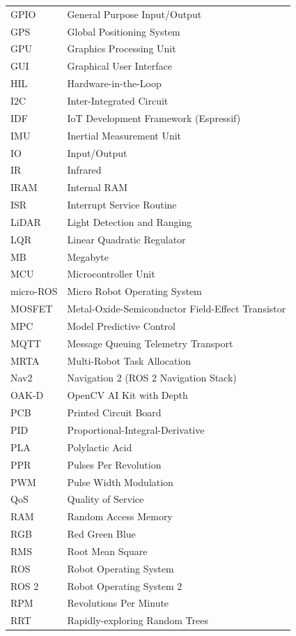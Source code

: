 \begin{longtable}{@{}p{3.5cm} p{10cm}@{}}
GPIO & General Purpose Input/Output \\
GPS & Global Positioning System \\
GPU & Graphics Processing Unit \\
GUI & Graphical User Interface \\
HIL & Hardware-in-the-Loop \\
I2C & Inter-Integrated Circuit \\
IDF & IoT Development Framework (Espressif) \\
IMU & Inertial Measurement Unit \\
IO & Input/Output \\
IR & Infrared \\
IRAM & Internal RAM \\
ISR & Interrupt Service Routine \\
LiDAR & Light Detection and Ranging \\
LQR & Linear Quadratic Regulator \\
MB & Megabyte \\
MCU & Microcontroller Unit \\
micro-ROS & Micro Robot Operating System \\
MOSFET & Metal-Oxide-Semiconductor Field-Effect Transistor \\
MPC & Model Predictive Control \\
MQTT & Message Queuing Telemetry Transport \\
MRTA & Multi-Robot Task Allocation \\
Nav2 & Navigation 2 (ROS 2 Navigation Stack) \\
OAK-D & OpenCV AI Kit with Depth \\
PCB & Printed Circuit Board \\
PID & Proportional-Integral-Derivative \\
PLA & Polylactic Acid \\
PPR & Pulses Per Revolution \\
PWM & Pulse Width Modulation \\
QoS & Quality of Service \\
RAM & Random Access Memory \\
RGB & Red Green Blue \\
RMS & Root Mean Square \\
ROS & Robot Operating System \\
ROS 2 & Robot Operating System 2 \\
RPM & Revolutions Per Minute \\
RRT & Rapidly-exploring Random Trees \\

\end{longtable}
